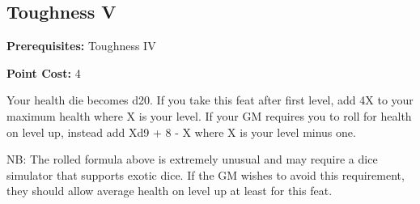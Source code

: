 \subsection{Toughness V}\label{feat:toughness5}

\noindent
\textbf{Prerequisites:} Toughness IV

\noindent
\textbf{Point Cost:} 4 

Your health die becomes d20. If you take this feat after first level, add 4X to
your maximum health where X is your level. If your GM requires you to roll for
health on level up, instead add Xd9 + 8 - X where X is your level minus one.

NB: The rolled formula above is extremely unusual and may require a dice
simulator that supports exotic dice. If the GM wishes to avoid this
requirement, they should allow average health on level up at least for this
feat.

